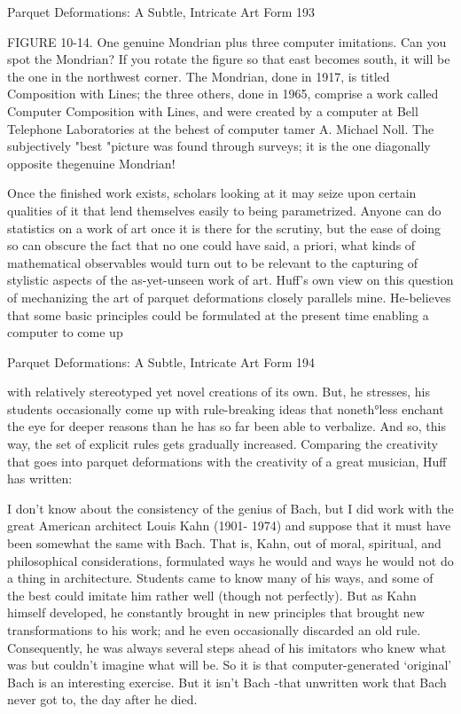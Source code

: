 Parquet Deformations: A Subtle, Intricate Art Form                                      193

FIGURE 10-14. One genuine Mondrian plus three computer imitations. Can you spot the
Mondrian? If you rotate the figure so that east becomes south, it will be the one in the
northwest corner. The Mondrian, done in 1917, is titled Composition with Lines; the
three others, done in 1965, comprise a work called Computer Composition with Lines,
and were created by a computer at Bell Telephone Laboratories at the behest of
computer tamer A. Michael Noll. The subjectively "best "picture was found through
surveys; it is the one diagonally opposite thegenuine Mondrian!

        Once the finished work exists, scholars looking at it may seize upon certain
qualities of it that lend themselves easily to being parametrized. Anyone can do statistics
on a work of art once it is there for the scrutiny, but the ease of doing so can obscure the
fact that no one could have said, a priori, what kinds of mathematical observables would
turn out to be relevant to the capturing of stylistic aspects of the as-yet-unseen work of
art.
        Huff's own view on this question of mechanizing the art of parquet deformations
closely parallels mine. He-believes that some basic principles could be formulated at the
present time enabling a computer to come up




Parquet Deformations: A Subtle, Intricate Art Form                                      194

with relatively stereotyped yet novel creations of its own. But, he stresses, his students
occasionally come up with rule-breaking ideas that noneth°less enchant the eye for
deeper reasons than he has so far been able to verbalize. And so, this way, the set of
explicit rules gets gradually increased.
        Comparing the creativity that goes into parquet deformations with the creativity
of a great musician, Huff has written:

           I don't know about the consistency of the genius of Bach, but I did work
   with the great American architect Louis Kahn (1901- 1974) and suppose that it
   must have been somewhat the same with Bach. That is, Kahn, out of moral,
   spiritual, and philosophical considerations, formulated ways he would and ways he
   would not do a thing in architecture. Students came to know many of his ways, and
   some of the best could imitate him rather well (though not perfectly). But as Kahn
   himself developed, he constantly brought in new principles that brought new
   transformations to his work; and he even occasionally discarded an old rule.
   Consequently, he was always several steps ahead of his imitators who knew what
   was but couldn't imagine what will be. So it is that computer-generated `original'
   Bach is an interesting exercise. But it isn't Bach -that unwritten work that Bach
   never got to, the day after he died.

